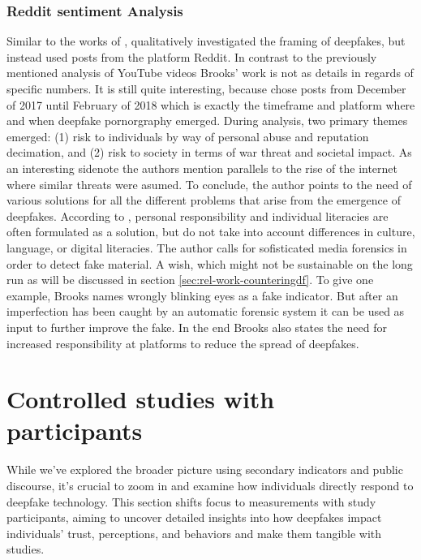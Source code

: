 \documentclass[
  a4paper,  %
  twoside,  %
  bibliography=totoc,
  headsepline,
  cleardoublepage=empty,
  parskip=half,
  draft=false
]{scrbook}
\begin{document}
\subsubsection*{Reddit sentiment Analysis}
Similar to the works of \citeauthor{leeBelieveNotBelieve2021}, \citeauthor{brooksPopularDiscourseDeepfakes2021} qualitatively investigated the framing of deepfakes, but instead used posts from the platform Reddit. In contrast to the previously mentioned analysis of YouTube videos Brooks' work is not as details in regards of specific numbers. It is still quite interesting, because \citeauthor{brooksPopularDiscourseDeepfakes2021} chose posts from December of 2017 until February of 2018 which is exactly the timeframe and platform where and when deepfake pornorgraphy emerged. During analysis, two primary themes emerged: (1) risk to individuals by way of personal abuse and reputation decimation, and (2) risk to society in terms of war threat and societal impact. As an interesting sidenote the authors mention parallels to the rise of the internet where similar threats were asumed. To conclude, the author points to the need of various solutions for all the different problems that arise from the emergence of deepfakes. According to \cite{brooksPopularDiscourseDeepfakes2021}, personal responsibility and individual literacies are often formulated as a solution, but do not take into account differences in culture, language, or digital literacies. The author calls for sofisticated media forensics in order to detect fake material. A wish, which might not be sustainable on the long run as will be discussed in section \ref{sec:rel-work-counteringdf}. To give one example, Brooks names wrongly blinking eyes as a fake indicator. But after an imperfection has been caught by an automatic forensic system it can be used as input to further improve the fake. In the end Brooks also states the need for increased responsibility at platforms to reduce the spread of deepfakes.

\section{Controlled studies with participants}
\label{sec:rel-studypart}

While we've explored the broader picture using secondary indicators and public discourse, it's crucial to zoom in and examine how individuals directly respond to deepfake technology. This section shifts focus to measurements with study participants, aiming to uncover detailed insights into how deepfakes impact individuals' trust, perceptions, and behaviors and make them tangible with studies.
\end{document}
